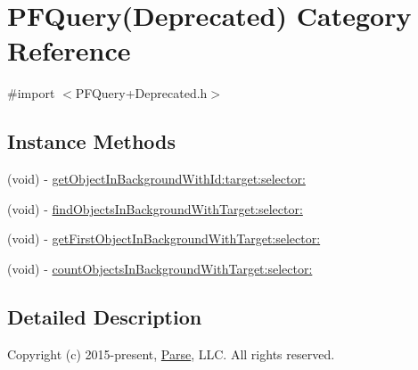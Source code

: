 \hypertarget{category_p_f_query_07_deprecated_08}{}\section{P\+F\+Query(Deprecated) Category Reference}
\label{category_p_f_query_07_deprecated_08}


{\ttfamily \#import $<$P\+F\+Query+\+Deprecated.\+h$>$}

\subsection*{Instance Methods}
\begin{DoxyCompactItemize}
\item 
(void) -\/ \hyperlink{category_p_f_query_07_deprecated_08_a9bc4148cc7b00da6409df69dd89a7563}{get\+Object\+In\+Background\+With\+Id\+:target\+:selector\+:}
\begin{DoxyCompactList}\small\item\em 

 \end{DoxyCompactList}\item 
(void) -\/ \hyperlink{category_p_f_query_07_deprecated_08_afbce3a6936238f6648fb377f42357270}{find\+Objects\+In\+Background\+With\+Target\+:selector\+:}
\begin{DoxyCompactList}\small\item\em 

 \end{DoxyCompactList}\item 
(void) -\/ \hyperlink{category_p_f_query_07_deprecated_08_a24c6281aa758bcbe31e1af11ce68d196}{get\+First\+Object\+In\+Background\+With\+Target\+:selector\+:}
\begin{DoxyCompactList}\small\item\em 

 \end{DoxyCompactList}\item 
(void) -\/ \hyperlink{category_p_f_query_07_deprecated_08_a946b651b581d6044f35a033337dcf543}{count\+Objects\+In\+Background\+With\+Target\+:selector\+:}
\begin{DoxyCompactList}\small\item\em 

 \end{DoxyCompactList}\end{DoxyCompactItemize}


\subsection{Detailed Description}
Copyright (c) 2015-\/present, \hyperlink{interface_parse}{Parse}, L\+L\+C. All rights reserved.

